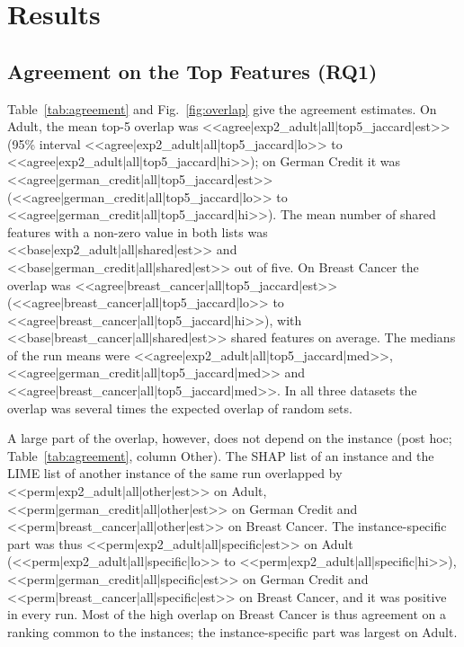 \documentclass{cys}
\begin{document}
\section{Results}
\label{sec:results}

\subsection{Agreement on the Top Features (RQ1)}

Table~\ref{tab:agreement} and Fig.~\ref{fig:overlap} give the agreement estimates. On
Adult, the mean top-5 overlap was <<agree|exp2_adult|all|top5_jaccard|est>> (95\%
interval <<agree|exp2_adult|all|top5_jaccard|lo>> to
<<agree|exp2_adult|all|top5_jaccard|hi>>); on German Credit it was
<<agree|german_credit|all|top5_jaccard|est>> (<<agree|german_credit|all|top5_jaccard|lo>>
to <<agree|german_credit|all|top5_jaccard|hi>>). The mean number of shared features with a non-zero value in both
lists was <<base|exp2_adult|all|shared|est>> and <<base|german_credit|all|shared|est>> out
of five. On Breast Cancer the overlap was
<<agree|breast_cancer|all|top5_jaccard|est>> (<<agree|breast_cancer|all|top5_jaccard|lo>>
to <<agree|breast_cancer|all|top5_jaccard|hi>>), with <<base|breast_cancer|all|shared|est>> shared features on average. The medians of the run means were
<<agree|exp2_adult|all|top5_jaccard|med>>, <<agree|german_credit|all|top5_jaccard|med>> and
<<agree|breast_cancer|all|top5_jaccard|med>>. In all three datasets the
overlap was several times the expected overlap of random sets.

A large part of the overlap, however, does not depend on the instance (post hoc;
Table~\ref{tab:agreement}, column Other). The SHAP list of an instance and the LIME list
of another instance of the same run overlapped by <<perm|exp2_adult|all|other|est>> on
Adult, <<perm|german_credit|all|other|est>> on German Credit and
<<perm|breast_cancer|all|other|est>> on Breast Cancer. The instance-specific part was thus
<<perm|exp2_adult|all|specific|est>> on Adult (<<perm|exp2_adult|all|specific|lo>> to
<<perm|exp2_adult|all|specific|hi>>), <<perm|german_credit|all|specific|est>> on German
Credit and <<perm|breast_cancer|all|specific|est>> on Breast Cancer, and it was positive in
every run. Most of the high overlap on Breast Cancer is thus agreement on a ranking common
to the instances; the instance-specific part was largest on Adult.
\end{document}
